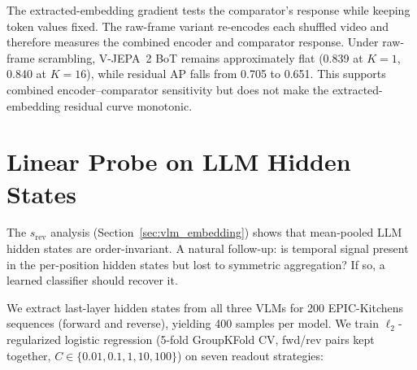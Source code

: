\documentclass{article}
\theoremstyle{remark}
\begin{document}
\begin{table}[h]
\centering
\caption{Corrected AP across near-equal scramble partitions on VCDB (10 seeds). Across nontrivial $K$, the maximum standard deviation is 0.0101; invariant rows have zero variance.}
\label{tab:scramble_data}
\end{table}

The extracted-embedding gradient tests the comparator's response while keeping token values fixed. The raw-frame variant re-encodes each shuffled video and therefore measures the combined encoder and comparator response. Under raw-frame scrambling, V-JEPA~2 BoT remains approximately flat (0.839 at $K\!=\!1$, 0.840 at $K\!=\!16$), while residual AP falls from 0.705 to 0.651. This supports combined encoder--comparator sensitivity but does not make the extracted-embedding residual curve monotonic.

\section{Linear Probe on LLM Hidden States}
\label{sec:linear_probe}

The $s_\text{rev}$ analysis (Section~\ref{sec:vlm_embedding}) shows that mean-pooled LLM hidden states are order-invariant. A natural follow-up: is temporal signal present in the per-position hidden states but lost to symmetric aggregation? If so, a learned classifier should recover it.

We extract last-layer hidden states from all three VLMs for 200 EPIC-Kitchens sequences (forward and reverse), yielding 400 samples per model. We train $\ell_2$-regularized logistic regression (5-fold GroupKFold CV, fwd/rev pairs kept together, $C \in \{0.01, 0.1, 1, 10, 100\}$) on seven readout strategies:
\end{document}
